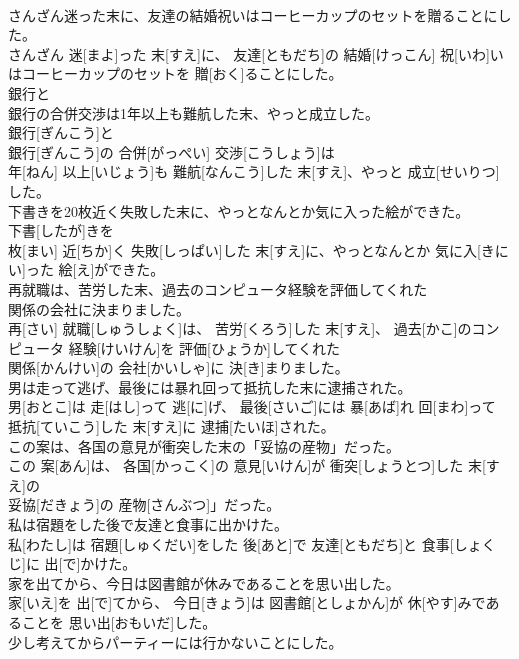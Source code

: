\documentclass[8pt]{extreport}
\begin{document}
\begin{CJK}{UTF8}{min}
\\	さんざん迷った末に、友達の結婚祝いはコーヒーカップのセットを贈ることにした。	
\\	さんざん 迷[まよ]った 末[すえ]に、 友達[ともだち]の 結婚[けっこん] 祝[いわ]いはコーヒーカップのセットを 贈[おく]ることにした。
\\	銀行と
\\	銀行の合併交渉は1年以上も難航した末、やっと成立した。	
\\	銀行[ぎんこう]と 
\\	銀行[ぎんこう]の 合併[がっぺい] 交渉[こうしょう]は 
\\	年[ねん] 以上[いじょう]も 難航[なんこう]した 末[すえ]、やっと 成立[せいりつ]した。
\\	下書きを20枚近く失敗した末に、やっとなんとか気に入った絵ができた。	
\\	下書[したが]きを 
\\	枚[まい] 近[ちか]く 失敗[しっぱい]した 末[すえ]に、やっとなんとか 気に入[きにい]った 絵[え]ができた。
\\	再就職は、苦労した末、過去のコンピュータ経験を評価してくれた
\\	関係の会社に決まりました。	
\\	再[さい] 就職[しゅうしょく]は、 苦労[くろう]した 末[すえ]、 過去[かこ]のコンピュータ 経験[けいけん]を 評価[ひょうか]してくれた 
\\	関係[かんけい]の 会社[かいしゃ]に 決[き]まりました。
\\	男は走って逃げ、最後には暴れ回って抵抗した末に逮捕された。	
\\	男[おとこ]は 走[はし]って 逃[に]げ、 最後[さいご]には 暴[あば]れ 回[まわ]って 抵抗[ていこう]した 末[すえ]に 逮捕[たいほ]された。
\\	この案は、各国の意見が衝突した末の「妥協の産物」だった。	
\\	この 案[あん]は、 各国[かっこく]の 意見[いけん]が 衝突[しょうとつ]した 末[すえ]の
\\	妥協[だきょう]の 産物[さんぶつ]」だった。
\\	私は宿題をした後で友達と食事に出かけた。	
\\	私[わたし]は 宿題[しゅくだい]をした 後[あと]で 友達[ともだち]と 食事[しょくじ]に 出[で]かけた。
\\	家を出てから、今日は図書館が休みであることを思い出した。	
\\	家[いえ]を 出[で]てから、 今日[きょう]は 図書館[としょかん]が 休[やす]みであることを 思い出[おもいだ]した。
\\	少し考えてからパーティーには行かないことにした。	

\end{CJK}
\end{document}
